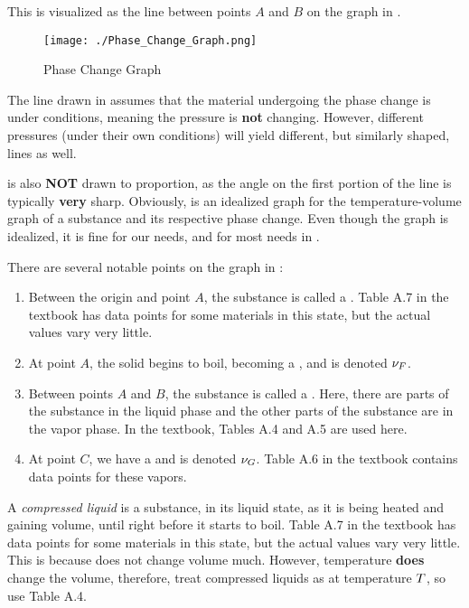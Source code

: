 This is visualized as the line between points $A$ and $B$ on the graph in .

\begin{figure}[h!tbp]
  \centering
  \texttt{[image: ./Phase\_Change\_Graph.png]}
  \caption{Phase Change Graph}
  \label{fig:Phase_Change}
\end{figure}

The line drawn in  assumes that the material undergoing the phase change is under  conditions, meaning the pressure is \textbf{not} changing.
However, different pressures (under their own  conditions) will yield different, but similarly shaped, lines as well.

\begin{remark*}
   is also \textbf{NOT} drawn to proportion, as the angle on the first portion of the line is typically \textbf{very} sharp.
  Obviously,  is an idealized graph for the temperature-volume graph of a substance and its respective phase change.
  Even though the graph is idealized, it is fine for our needs, and for most needs in .
\end{remark*}

There are several notable points on the graph in :
\begin{enumerate}[noitemsep]
\item Between the origin and point $A$, the substance is called a .
  Table A.7 in the textbook has data points for some materials in this state, but the actual values vary very little.
\item At point $A$, the solid begins to boil, becoming a , and is denoted $\nu_{F}$.
\item Between points $A$ and $B$, the substance is called a .
  Here, there are parts of the substance in the liquid phase and the other parts of the substance are in the vapor phase.
  In the textbook, Tables A.4 and A.5 are used here.
\item At point $C$, we have a  and is denoted $\nu_{G}$.
  Table A.6 in the textbook contains data points for these vapors.
\end{enumerate}

\begin{definition}\label{def:Compressed_Liquid}
  A \emph{compressed liquid} is a substance, in its liquid state, as it is being heated and gaining volume, until right before it starts to boil.
  Table A.7 in the textbook has data points for some materials in this state, but the actual values vary very little.
  This is because  does not change volume much.
  However, temperature \textbf{does} change the volume, therefore, treat compressed liquids as  at temperature $T$, so use Table A.4.
\end{definition}

